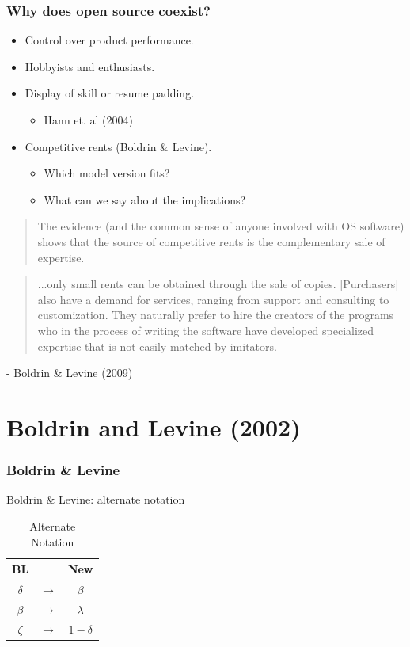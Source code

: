 \documentclass{beamer}
\begin{document}
\begin{frame}[t]
  \frametitle{Why does open source coexist?}
  \begin{itemize}
    \item<+-> Control over product performance.
    \item<+-> Hobbyists and enthusiasts.
    \item<+-> Display of skill or resume padding.
    \begin{itemize}
        \item<+-> Hann et. al (2004)
    \end{itemize}
    \item<+-> Competitive rents (Boldrin \& Levine).
    \begin{itemize}
        \item<+-> Which model version fits?
        \item<+-> What can we say about the implications?
    \end{itemize}
  \end{itemize}
\end{frame}

\begin{frame}[t]
  \begin{quotation}
    The evidence (and the common sense of anyone involved with OS software) shows   that the source of competitive rents is the complementary sale of expertise.
  \end{quotation}
  \begin{quotation}
      ...only small rents can be obtained through the sale of copies. [Purchasers] also have a demand for services, ranging from support and consulting to customization. They naturally prefer to hire the creators of the programs who in the process of writing the software have developed specialized expertise that is not easily matched by imitators.
  \end{quotation}
  - Boldrin \& Levine (2009)
\end{frame}


\section{Boldrin and Levine (2002)}
\label{sec:boldrin_and_levine_2002}

\begin{frame}
  \frametitle{Boldrin \& Levine}
  Boldrin \& Levine: alternate notation\\
  \begin{table}[ht]
    \caption{Alternate Notation}
    \centering
  \begin{tabular}{c c c}
    \hline\hline
      BL &  & New\\ [0.5ex] 
    \hline
    $\delta$ & $\longrightarrow$ & $\beta$  \\ 
    $\beta$ & $\longrightarrow$ & $\lambda$ \\
    $\zeta$ & $\longrightarrow$ & $1 - \delta$ \\[1ex] 
    \hline
   \end{tabular}
   \label{table:altnot}
  \end{table}
\end{frame}
\end{document}
